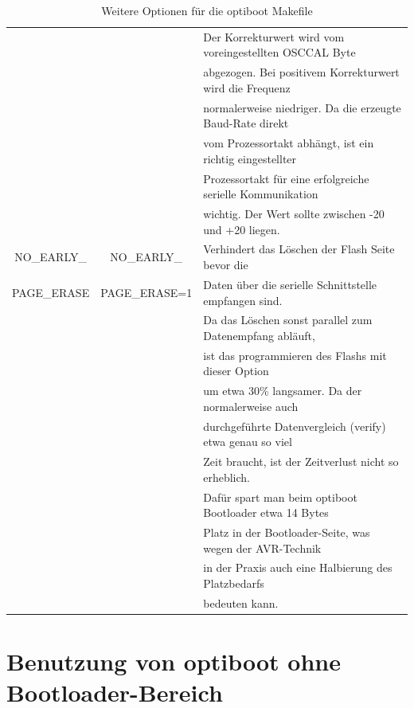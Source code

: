 \begin{table}[H]
\begin{center}
\begin{tabular}{| c | c | l |}
                   &                & Der Korrekturwert wird vom voreingestellten OSCCAL Byte \\
                   &                & abgezogen. Bei positivem Korrekturwert wird die Frequenz \\
                   &                & normalerweise niedriger. Da die erzeugte Baud-Rate direkt \\
                   &                & vom Prozessortakt abhängt, ist ein richtig eingestellter \\
                   &                & Prozessortakt für eine erfolgreiche serielle Kommunikation \\
                   &                & wichtig. Der Wert sollte zwischen -20 und +20 liegen. \\
    \hline
NO\_EARLY\_        &  NO\_EARLY\_   & Verhindert das Löschen der Flash Seite bevor die \\
PAGE\_ERASE        & PAGE\_ERASE=1  & Daten über die serielle Schnittstelle empfangen sind. \\
                   &                & Da das Löschen sonst parallel zum Datenempfang abläuft, \\
                   &                & ist das programmieren des Flashs mit dieser Option \\
                   &                & um etwa 30\% langsamer. Da der normalerweise auch \\
		   &                & durchgeführte Datenvergleich (verify) etwa genau so viel \\
                   &                & Zeit braucht, ist der Zeitverlust nicht so erheblich. \\
                   &                & Dafür spart man beim optiboot Bootloader etwa 14 Bytes \\
		   &                & Platz in der Bootloader-Seite, was wegen der AVR-Technik \\
		   &                & in der Praxis auch eine Halbierung des Platzbedarfs \\
		   &                & bedeuten kann. \\
    \hline
    \end{tabular}
  \end{center}
  \caption{Weitere Optionen für die optiboot Makefile}
  \label{tab:options3}
\end{table}

\section{Benutzung von optiboot ohne Bootloader-Bereich}

